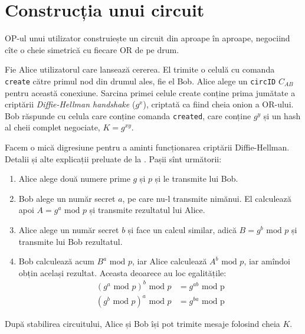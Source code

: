 
\section{Construcția unui circuit}

\indent\indent OP-ul unui utilizator construiește un circuit din aproape
în aproape, negociind cîte o cheie simetrică cu fiecare OR de pe drum.

Fie Alice utilizatorul care lansează cererea. El trimite o celulă cu
comanda \texttt{create} către primul nod din drumul ales, fie el Bob.
Alice alege un \texttt{circID} $C_{AB}$ pentru această conexiune.
Sarcina primei celule create conține prima jumătate a criptării
\emph{Diffie-Hellman handshake} ($g^x$), criptată ca fiind cheia onion
a OR-ului. Bob răspunde cu celula care conține comanda \texttt{created},
care conține $ g^y $ și un hash al cheii complet negociate, $ K = g^{xy} $.

\vspace{1cm}
Facem o mică digresiune pentru a aminti funcționarea criptării Diffie-Hellman.
Detalii și alte explicații preluate de la \cite{dhse}.
Pașii sînt următorii:
\begin{enumerate}[(1)]
  \item Alice alege două numere prime $ g $ și $ p $ și le transmite lui Bob.
  \item Bob alege un număr secret $ a $, pe care nu-l transmite nimănui.
    El calculează apoi $ A = g^a \text{ mod } p $ și transmite rezultatul lui Alice.
  \item Alice alege un număr secret $ b $ și face un calcul similar,
    adică $ B = g^b \text{ mod } p $ și transmite lui Bob rezultatul.
  \item Bob calculează acum $ B^a \text{ mod } p $, iar Alice calculează
    $ A^b \text{ mod } p $, iar amîndoi obțin a\-ce\-lași rezultat.
    Aceasta deoarece au loc egalitățile:
    \begin{align*}
      (g^a \text{ mod } p)^b \text{ mod } p &= g^{ab} \text{ mod p} \\
      (g^b \text{ mod } p)^a \text{ mod } p &= g^{ba} \text{ mod p}
    \end{align*}
\end{enumerate}
\vspace{1cm}

După stabilirea circuitului, Alice și Bob își pot trimite mesaje folosind
cheia $ K $.

